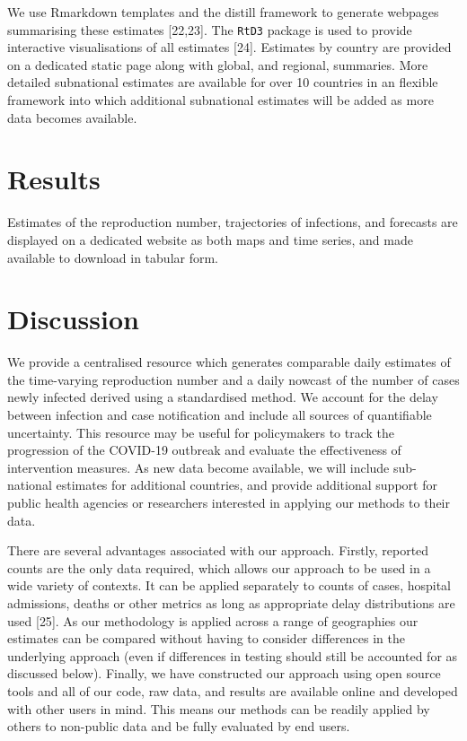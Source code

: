 \documentclass[
]{article}
\begin{document}
We use Rmarkdown templates and the distill framework to generate
webpages summarising these estimates {[}22,23{]}. The \texttt{RtD3}
package is used to provide interactive visualisations of all estimates
{[}24{]}. Estimates by country are provided on a dedicated static page
along with global, and regional, summaries. More detailed subnational
estimates are available for over 10 countries in an flexible framework
into which additional subnational estimates will be added as more data
becomes available.

\hypertarget{results}{%
\section{Results}\label{results}}

Estimates of the reproduction number, trajectories of infections, and
forecasts are displayed on a dedicated website as both maps and time
series, and made available to download in tabular form.

\hypertarget{discussion}{%
\section{Discussion}\label{discussion}}

We provide a centralised resource which generates comparable daily
estimates of the time-varying reproduction number and a daily nowcast of
the number of cases newly infected derived using a standardised method.
We account for the delay between infection and case notification and
include all sources of quantifiable uncertainty. This resource may be
useful for policymakers to track the progression of the COVID-19
outbreak and evaluate the effectiveness of intervention measures. As new
data become available, we will include sub-national estimates for
additional countries, and provide additional support for public health
agencies or researchers interested in applying our methods to their
data.

There are several advantages associated with our approach. Firstly,
reported counts are the only data required, which allows our approach to
be used in a wide variety of contexts. It can be applied separately to
counts of cases, hospital admissions, deaths or other metrics as long as
appropriate delay distributions are used {[}25{]}. As our methodology is
applied across a range of geographies our estimates can be compared
without having to consider differences in the underlying approach (even
if differences in testing should still be accounted for as discussed
below). Finally, we have constructed our approach using open source
tools and all of our code, raw data, and results are available online
and developed with other users in mind. This means our methods can be
readily applied by others to non-public data and be fully evaluated by
end users.
\end{document}
